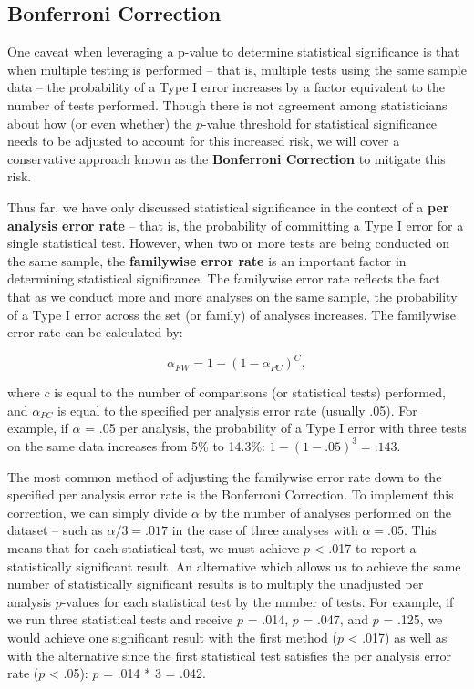 \documentclass[
]{book}
\begin{document}
\hypertarget{bonferroni-correction}{%
\subsection{Bonferroni Correction}\label{bonferroni-correction}}

One caveat when leveraging a p-value to determine statistical significance is that when multiple testing is performed -- that is, multiple tests using the same sample data -- the probability of a Type I error increases by a factor equivalent to the number of tests performed. Though there is not agreement among statisticians about how (or even whether) the \(p\)-value threshold for statistical significance needs to be adjusted to account for this increased risk, we will cover a conservative approach known as the \textbf{Bonferroni Correction} to mitigate this risk.

Thus far, we have only discussed statistical significance in the context of a \textbf{per analysis error rate} -- that is, the probability of committing a Type I error for a single statistical test. However, when two or more tests are being conducted on the same sample, the \textbf{familywise error rate} is an important factor in determining statistical significance. The familywise error rate reflects the fact that as we conduct more and more analyses on the same sample, the probability of a Type I error across the set (or family) of analyses increases. The familywise error rate can be calculated by:

\[ \alpha_{FW} = 1 - (1 - \alpha_{PC})^C,  \]

where \(c\) is equal to the number of comparisons (or statistical tests) performed, and \(\alpha_{PC}\) is equal to the specified per analysis error rate (usually .05). For example, if \(\alpha\) = .05 per analysis, the probability of a Type I error with three tests on the same data increases from 5\% to 14.3\%: \(1 - (1 - .05)^3 = .143\).

The most common method of adjusting the familywise error rate down to the specified per analysis error rate is the Bonferroni Correction. To implement this correction, we can simply divide \(\alpha\) by the number of analyses performed on the dataset -- such as \(\alpha / 3 = .017\) in the case of three analyses with \(\alpha = .05\). This means that for each statistical test, we must achieve \(p\) \textless{} .017 to report a statistically significant result. An alternative which allows us to achieve the same number of statistically significant results is to multiply the unadjusted per analysis \(p\)-values for each statistical test by the number of tests. For example, if we run three statistical tests and receive \(p\) = .014, \(p\) = .047, and \(p\) = .125, we would achieve one significant result with the first method (\(p\) \textless{} .017) as well as with the alternative since the first statistical test satisfies the per analysis error rate (\(p\) \textless{} .05): \(p\) = .014 * 3 = .042.
\end{document}
